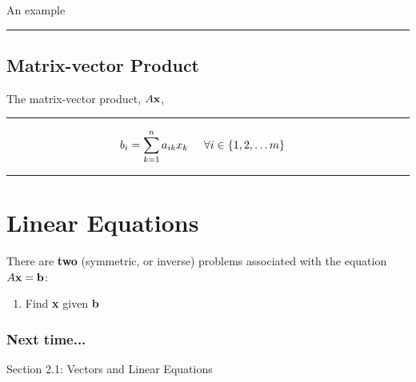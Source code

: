 \begin{example}
An example
\end{example}

\rule[0.01in]{\textwidth}{0.0025in}



\subsection*{Matrix-vector Product}
The matrix-vector product, $A{\bf x}$, 
 
 \rule[0.01in]{\textwidth}{0.0025in}

 
\begin{align*}
	b_{i} &= \sum_{k=1}^n  a_{ik} x_{k}  \hspace{0.5cm}  \forall i \in \{1, 2, \dots m \}
\end{align*}



\rule[0.01in]{\textwidth}{0.0025in}

 
 
 
 
 
 
 
 
 
 
%
%
\section{Linear Equations}

There are \textbf{two} (symmetric, or inverse) problems associated with the equation $A{\bf x} = {\bf b}$:
\begin{enumerate}
	\item {\color{blue}Find} {\bf x} given  {\bf b}
\end{enumerate}

   
 
 
 
  





\subsubsection*{Next time...}
Section 2.1: Vectors and Linear Equations





